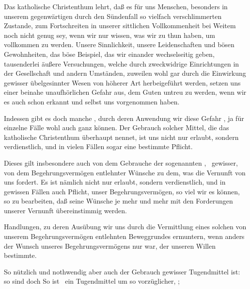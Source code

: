 \begin{aufza}
\item Das katholische Christenthum lehrt, daß es für uns Menschen, besonders in unserem gegenwärtigen durch den Sündenfall so vielfach verschlimmerten Zustande, zum Fortschreiten in unserer sittlichen Vollkommenheit bei Weitem noch nicht genug sey, wenn wir nur wissen, was wir zu thun haben, um vollkommen zu werden. Unsere Sinnlichkeit, unsere Leidenschaften und bösen Gewohnheiten, das böse Beispiel, das wir einander wechselseitig geben, tausenderlei äußere Versuchungen, welche durch zweckwidrige Einrichtungen in der Gesellschaft und andern Umständen, zuweilen wohl gar durch die Einwirkung gewisser übelgesinnter Wesen von höherer Art herbeigeführt werden, setzen uns einer beinahe unaufhörlichen Gefahr aus, dem Guten untreu zu werden, wenn wir es auch schon erkannt und selbst uns vorgenommen haben.
\item Indessen gibt es doch manche , durch deren Anwendung wir diese Gefahr , ja für einzelne Fälle wohl auch ganz  können. Der Gebrauch solcher Mittel, die das katholische Christenthum überhaupt  nennet, ist uns nicht nur erlaubt, sondern verdienstlich, und in vielen Fällen sogar eine bestimmte Pflicht.
\item Dieses gilt insbesondere auch von dem Gebrauche der sogenannten , \dh\  gewisser, von dem Begehrungsvermögen entlehnter Wünsche zu dem, was die Vernunft von uns fordert. Es ist nämlich nicht nur erlaubt, sondern verdienstlich, und in gewissen Fällen auch Pflicht, unser Begehrungsvermögen, so viel wir es können, so zu bearbeiten, daß seine Wünsche je mehr und mehr mit den Forderungen unserer Vernunft übereinstimmig werden.~
\item Handlungen, zu deren Ausübung wir uns durch die Vermittlung eines solchen von unserem Begehrungsvermögen entlehnten Beweggrundes ermuntern,  wenn anders der Wunsch unseres Begehrungsvermögens nur  war, der unseren Willen bestimmte.
\item So nützlich und nothwendig aber auch der Gebrauch gewisser Tugendmittel ist: so sind doch  So ist \zB\  ein Tugendmittel um so vorzüglicher, ; \usw\

\end{aufza}
